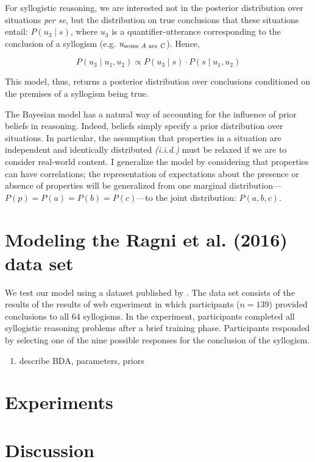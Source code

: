 \documentclass[floatsintext, doc]{apa6}
\begin{document}
For syllogistic reasoning, we are interested not in the posterior distribution over situations \emph{per se}, but the distribution on true conclusions that these situations entail: $P(u_3 \mid s)$, where $u_3$ is a quantifier-utterance corresponding to the conclusion of a syllogism (e.g. $u_{\textrm{some  \emph{A} are \emph{C}}}$). Hence,

$$
P(u_3 \mid u_1, u_2) \propto P(u_3\mid s) \cdot P(s \mid u_1, u_2)
$$


This model, thus, returns a posterior distribution over conclusions conditioned on the premises of a syllogism being true.


The Bayesian model has a natural way of accounting for the influence of prior beliefs in reasoning. Indeed, beliefs simply specify a prior distribution over situations. In particular, the assumption that properties in a situation are independent and identically distributed \emph{(i.i.d.)} must be relaxed if we are to consider real-world content. I generalize the model by considering that properties can have correlations; the representation of expectations about the presence or absence of properties will be generalized from one marginal distribution---$P(p)=P(a)=P(b)=P(c)$---to the joint distribution: $P(a, b, c)$.

\section{Modeling the Ragni et al. (2016) data set}

We test our model using a dataset published by . The data set consists of the results of the results of web experiment in which participants ($n = 139$) provided conclusions to all 64 syllogisms. In the experiment, participants completed all syllogistic reasoning problems after a brief training phase. Participants responded by selecting one of the nine possible responses for the conclusion of the syllogism.


\begin{enumerate}
\item describe BDA, parameters, priors
\end{enumerate}


\section{Experiments}

\section{Discussion}


\newpage



\end{document}

